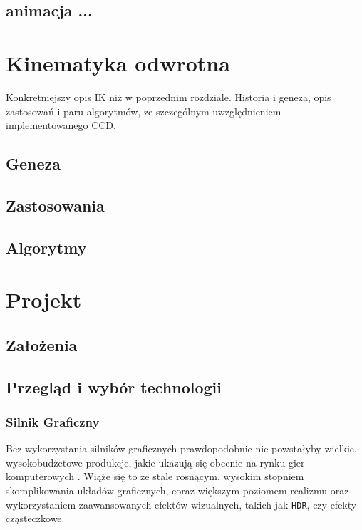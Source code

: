 \documentclass[11pt]{mwrep}
\begin{document}
  \section{animacja ...}
  
\chapter{Kinematyka odwrotna}
Konkretniejszy opis IK niż w poprzednim rozdziale. Historia i geneza, opis zastosowań i paru algorytmów, ze szczególnym uwzględnieniem implementowanego CCD.
  \section{Geneza}
  \section{Zastosowania}
  \section{Algorytmy}

\chapter{Projekt}

  \section{Założenia}

  \section{Przegląd i wybór technologii}

    \subsection{Silnik Graficzny}

    Bez wykorzystania silników graficznych prawdopodobnie nie powstałyby wielkie, wy\-so\-ko\-bud\-że\-to\-we produkcje, jakie ukazują się obecnie na rynku gier komputerowych	. Wiąże się to ze stale rosnącym, wysokim stopniem skomplikowania układów graficznych, coraz większym poziomem realizmu oraz wykorzystaniem zaawansowanych efektów wizualnych, takich jak \texttt{HDR}, czy efekty cząsteczkowe. 
\end{document}
